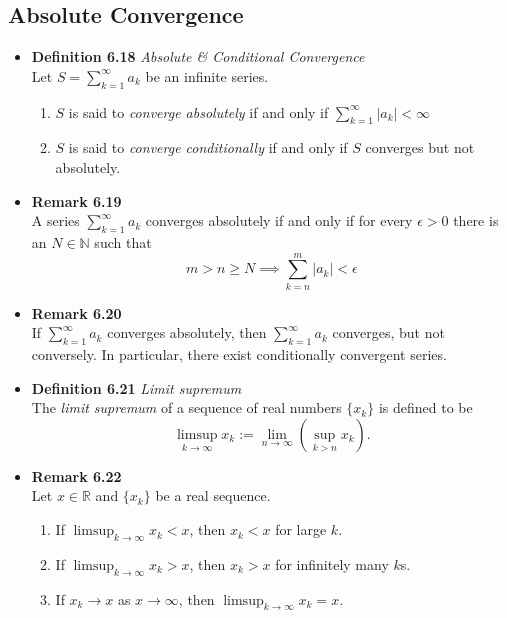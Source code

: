 \documentclass[11pt,a4paper]{article}
\begin{document}
\subsection{Absolute Convergence}

\begin{itemize}
    \item \textbf{Definition 6.18} \emph{Absolute \& Conditional Convergence} \\
        Let $S = \sum_{k=1}^\infty a_k$ be an infinite series.
        \begin{enumerate}
            \item $S$ is said to \emph{converge absolutely} if and only if
                $\sum_{k=1}^\infty |a_k| < \infty$
            \item $S$ is said to \emph{converge conditionally} if and only if $S$ converges
                but not absolutely.
        \end{enumerate}

    \item \textbf{Remark 6.19} \\
        A series $\sum_{k=1}^\infty a_k$ converges absolutely if and only if for every
        $\epsilon > 0$ there is an $N \in \mathbb{N}$ such that
        \[
            m > n \geq N \implies \sum_{k=n}^m |a_k| < \epsilon
        \]

    \item \textbf{Remark 6.20} \\
        If $\sum_{k=1}^\infty a_k$ converges absolutely, then $\sum_{k=1}^\infty a_k$
        converges, but not conversely.
        In particular, there exist conditionally convergent series.

    \item \textbf{Definition 6.21} \emph{Limit supremum} \\
        The \emph{limit supremum} of a sequence of real numbers $\{x_k\}$ is defined to be
        \[
            \limsup_{k \to \infty} x_k := \lim_{n \to \infty} \left( \sup_{k>n} x_k \right).
        \]

    \item \textbf{Remark 6.22} \\
        Let $x \in \mathbb{R}$ and $\{x_k\}$ be a real sequence.
        \begin{enumerate}
            \item If $\limsup_{k \to \infty} x_k < x$, then $x_k < x$ for large $k$.
            \item If $\limsup_{k \to \infty} x_k > x$, then $x_k > x$ for infinitely many $k$s.
            \item If $x_k \to x$ as $x \to \infty$, then $\limsup_{k \to \infty} x_k = x$.
        \end{enumerate}


\end{itemize}
\end{document}
